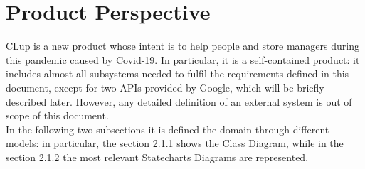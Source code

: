 \section{Product Perspective}
CLup is a new product whose intent is to help people and store managers during this pandemic caused by Covid-19. In particular, it is a self-contained product: it includes almost all subsystems needed to fulfil the requirements defined in this document, except for two APIs provided by Google, which will be briefly described later. However, any detailed definition of an external system is out of scope of this document.\\
In the following two subsections it is defined the domain through different models: in particular, the section 2.1.1 shows the Class Diagram, while in the section 2.1.2 the most relevant Statecharts Diagrams are represented. 








 
 